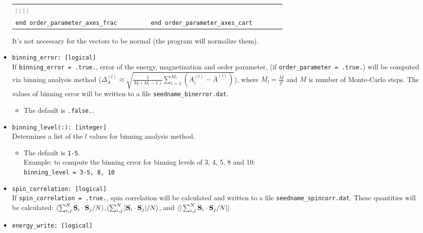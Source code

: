 \documentclass[10pt]{report}
\begin{document}
\begin{itemize}
\begin{center}
\begin{tabular}{p{0.4\linewidth}p{0.4\linewidth}}
           \hspace{0.3cm}  $\vdots$ \hspace{0.7cm}    $\vdots$ \hspace{0.45cm} $\vdots$ \hspace{0.55cm} $\vdots$  \\
        {\tt end order\_parameter\_axes\_frac}    & {\tt end order\_parameter\_axes\_cart} \\
        \bottomrule
    \end{tabular}
\end{center}
It’s not necessary for the vectors to be normal (the program will normalize them).
\item {\tt binning\_error: [logical]}                    \\
If {\tt binning\_error = .true.}, error of the energy, magnetization and order parameter,
 (if {\tt order\_parameter = .true.}) will be computed via binning analysis method
($\Delta_A^{(l)}\approx\sqrt{\frac{1}{M_l(M_l-1)}\sum_{i=1}^{M_l}(A_i^{(l)}-\bar{A}^{(l)})}$),
 where $M_l=\frac{M}{2^l}$ and $M$ is number of Monte-Carlo steps.
The values of binning error will be written to a file {\tt seedname\_binerror.dat}.
\begin{itemize} [label=\adfhalfrightarrowhead]
\item The default is {\tt .false.}.
\end{itemize}
\item {\tt binning\_level(:): [integer]}                    \\
Determines a list of the $l$ values for binning analysis method. 
\begin{itemize} [label=\adfhalfrightarrowhead]
\item The default is {\tt 1-5}.\\
 Example: to compute the binning 
error for binning levels of 3, 4, 5, 8 and 10:\\
{\tt binning\_level = 3-5, 8, 10}
\end{itemize}
\item {\tt spin\_correlation: [logical]}                 \\
If {\tt spin\_correlation = .true.}, spin correlation will be calculated and
 written to a file {\tt seedname\_spincorr.dat}. These quantities will be calculated:
$\braket{\sum_{i,j}^N\mathbf{S}_i\cdot\mathbf{S}_j/N}$,$\braket{\sum_{i,j}^N|\mathbf{S}_i\cdot\mathbf{S}_j|/N}$, and 
$\braket{|\sum_{i,j}^N\mathbf{S}_i\cdot\mathbf{S}_j/N|}$
\item {\tt energy\_write: [logical]}                     \\

\end{itemize}
\end{document}
